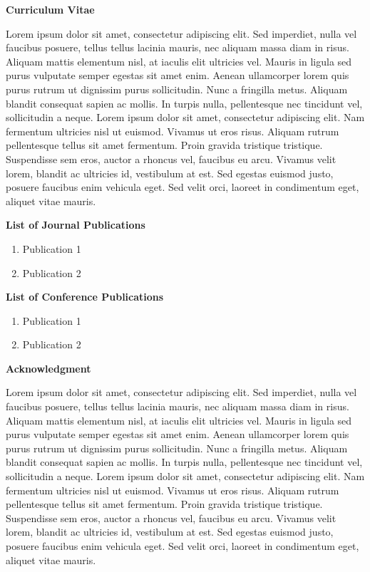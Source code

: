 \newpage
\thispagestyle{empty}
\cleardoublepage

\thispagestyle{empty}
\begin{center}
\textbf{\Large Curriculum Vitae}
\end{center}
Lorem ipsum dolor sit amet, consectetur adipiscing elit. Sed imperdiet, nulla vel faucibus posuere, tellus tellus lacinia mauris, nec aliquam massa diam in risus. Aliquam mattis elementum nisl, at iaculis elit ultricies vel. Mauris in ligula sed purus vulputate semper egestas sit amet enim. Aenean ullamcorper lorem quis purus rutrum ut dignissim purus sollicitudin. Nunc a fringilla metus. Aliquam blandit consequat sapien ac mollis. In turpis nulla, pellentesque nec tincidunt vel, sollicitudin a neque. Lorem ipsum dolor sit amet, consectetur adipiscing elit. Nam fermentum ultricies nisl ut euismod. Vivamus ut eros risus. Aliquam rutrum pellentesque tellus sit amet fermentum. Proin gravida tristique tristique. Suspendisse sem eros, auctor a rhoncus vel, faucibus eu arcu. Vivamus velit lorem, blandit ac ultricies id, vestibulum at est. Sed egestas euismod justo, posuere faucibus enim vehicula eget. Sed velit orci, laoreet in condimentum eget, aliquet vitae mauris.

\noindent \textbf{\large List of Journal Publications}
\begin{enumerate}
 \item Publication 1
 \item Publication 2
\end{enumerate}

\noindent \textbf{\large List of Conference Publications}
\begin{enumerate}
 \item Publication 1
 \item Publication 2
\end{enumerate}

\newpage
\thispagestyle{empty}
\cleardoublepage

\thispagestyle{empty}
\begin{center}
\textbf{\Large Acknowledgment}
\end{center}
Lorem ipsum dolor sit amet, consectetur adipiscing elit. Sed imperdiet, nulla vel faucibus posuere, tellus tellus lacinia mauris, nec aliquam massa diam in risus. Aliquam mattis elementum nisl, at iaculis elit ultricies vel. Mauris in ligula sed purus vulputate semper egestas sit amet enim. Aenean ullamcorper lorem quis purus rutrum ut dignissim purus sollicitudin. Nunc a fringilla metus. Aliquam blandit consequat sapien ac mollis. In turpis nulla, pellentesque nec tincidunt vel, sollicitudin a neque. Lorem ipsum dolor sit amet, consectetur adipiscing elit. Nam fermentum ultricies nisl ut euismod. Vivamus ut eros risus. Aliquam rutrum pellentesque tellus sit amet fermentum. Proin gravida tristique tristique. Suspendisse sem eros, auctor a rhoncus vel, faucibus eu arcu. Vivamus velit lorem, blandit ac ultricies id, vestibulum at est. Sed egestas euismod justo, posuere faucibus enim vehicula eget. Sed velit orci, laoreet in condimentum eget, aliquet vitae mauris.

\newpage
\thispagestyle{empty}
\cleardoublepage
